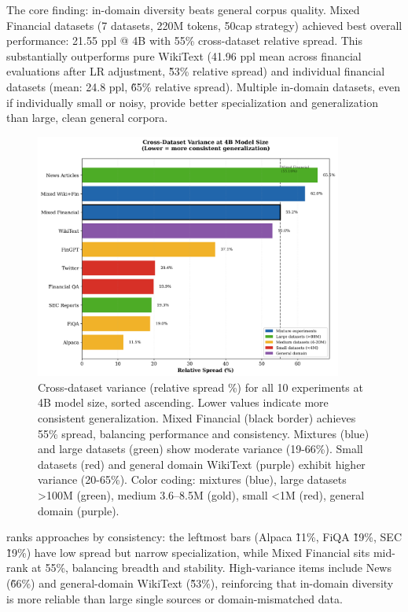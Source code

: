 The core finding: in-domain diversity beats general corpus quality. Mixed Financial datasets (7 datasets, 220M tokens, 50cap strategy) achieved best overall performance: 21.55 ppl @ 4B with 55\% cross-dataset relative spread. This substantially outperforms pure WikiText (41.96 ppl mean across financial evaluations after LR adjustment, \~53\% relative spread) and individual financial datasets (mean: 24.8 ppl, \~65\% relative spread). Multiple in-domain datasets, even if individually small or noisy, provide better specialization and generalization than large, clean general corpora.

\begin{figure}[h]
\centering
\includegraphics[width=0.9\textwidth]{figures/bar_variance.png}
\caption[Cross-Dataset Variance Comparison]{Cross-dataset variance (relative spread \%) for all 10 experiments at 4B model size, sorted ascending. Lower values indicate more consistent generalization. Mixed Financial (black border) achieves 55\% spread, balancing performance and consistency. Mixtures (blue) and large datasets (green) show moderate variance (19-66\%). Small datasets (red) and general domain WikiText (purple) exhibit higher variance (20-65\%). Color coding: mixtures (blue), large datasets >100M (green), medium 3.6–8.5M (gold), small <1M (red), general domain (purple).}
\label{fig:bar_variance}
\end{figure}

 ranks approaches by consistency: the leftmost bars (Alpaca \~11\%, FiQA \~19\%, SEC \~19\%) have low spread but narrow specialization, while Mixed Financial sits mid-rank at 55\%, balancing breadth and stability. High-variance items include News (\~66\%) and general-domain WikiText (\~53\%), reinforcing that in-domain diversity is more reliable than large single sources or domain-mismatched data.

